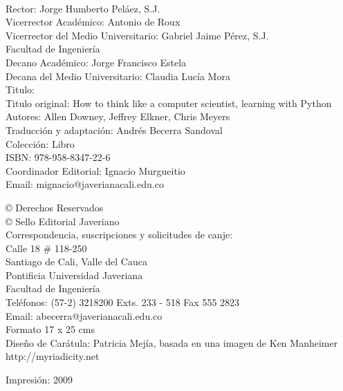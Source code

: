 \parindent0pt
{\tiny \ }

{\scriptsize 
Rector: Jorge Humberto Peláez, S.J.\\
Vicerrector Académico: Antonio de Roux\\
Vicerrector del Medio Universitario: Gabriel Jaime Pérez, S.J.\\

Facultad de Ingeniería\\
Decano Académico: Jorge Francisco Estela \\
Decana del Medio Universitario: Claudia Lucía Mora \\


Titulo:  \introprog \\
Titulo original: How to think like a computer scientist, learning with Python
Autores: Allen Downey, Jeffrey Elkner, Chris Meyers \\
Traducción y adaptación: Andrés Becerra Sandoval \\
Colección: Libro\\

ISBN: 978-958-8347-22-6 \\

Coordinador Editorial: Ignacio Murgueitio\\
Email: mignacio@javerianacali.edu.co

© Derechos Reservados\\
© Sello Editorial Javeriano\\

Correspondencia, suscripciones y solicitudes de canje:\\
Calle 18 \# 118-250\\
Santiago de Cali, Valle del Cauca\\
Pontificia Universidad Javeriana\\
Facultad de Ingeniería\\
Teléfonos: (57-2) 3218200 Exts. 233 - 518 Fax 555 2823\\
Email: abecerra@javerianacali.edu.co \\

Formato 17  x  25 cms\\

Diseño de Carátula: 
Patricia Mejía, basada en una imagen de Ken Manheimer \\
http://myriadicity.net

Impresión: 2009
}
\newpage
\thispagestyle{empty}
\vspace{0.25in}

